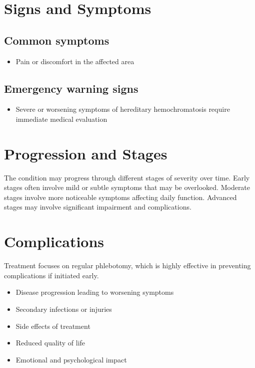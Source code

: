 \section{Signs and Symptoms}

\subsection{Common symptoms}
\begin{itemize}[noitemsep]
  \item Pain or discomfort in the affected area
  \end{itemize}

\subsection{Emergency warning signs}
\begin{itemize}[noitemsep]
  \item Severe or worsening symptoms of hereditary hemochromatosis require immediate medical evaluation
\end{itemize}
\section{Progression and Stages}
The condition may progress through different stages of severity over time. Early stages often involve mild or subtle symptoms that may be overlooked. Moderate stages involve more noticeable symptoms affecting daily function. Advanced stages may involve significant impairment and complications.
\section{Complications}
Treatment focuses on regular phlebotomy, which is highly effective in preventing complications if initiated early.

\begin{itemize}[noitemsep]
  \item Disease progression leading to worsening symptoms
  \item Secondary infections or injuries
  \item Side effects of treatment
  \item Reduced quality of life
  \item Emotional and psychological impact
\end{itemize}
